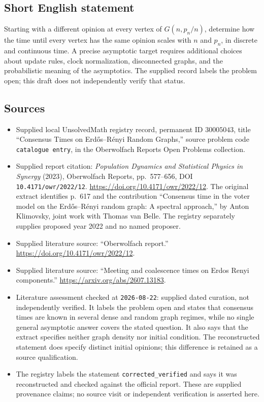 \documentclass[11pt]{article}
\begin{document}
\subsection{Short English statement}
Starting with a different opinion at every vertex of \(G(n,p_n/n)\), determine how the time until every vertex has the same opinion scales with \(n\) and \(p_n\), in discrete and continuous time. A precise asymptotic target requires additional choices about update rules, clock normalization, disconnected graphs, and the probabilistic meaning of the asymptotics. The supplied record labels the problem open; this draft does not independently verify that status.
\subsection{Sources}
\begin{itemize}
\item Supplied local UnsolvedMath registry record, permanent ID \(30005043\), title ``Consensus Times on Erd\H{o}s--R\'enyi Random Graphs,'' source problem code \texttt{catalogue entry}, in the Oberwolfach Reports Open Problems collection.
\item Supplied report citation: \emph{Population Dynamics and Statistical Physics in Synergy} (2023), Oberwolfach Reports, pp.~577--656, DOI \texttt{10.4171/owr/2022/12}. \url{https://doi.org/10.4171/owr/2022/12}. The original extract identifies p.~617 and the contribution ``Consensus time in the voter model on the Erd\H{o}s--R\'enyi random graph: A spectral approach,'' by Anton Klimovsky, joint work with Thomas van Belle. The registry separately supplies proposed year 2022 and no named proposer.
\item Supplied literature source: ``Oberwolfach report.'' \url{https://doi.org/10.4171/owr/2022/12}.
\item Supplied literature source: ``Meeting and coalescence times on Erdos Renyi components.'' \url{https://arxiv.org/abs/2607.13183}.
\item Literature assessment checked at \texttt{2026-08-22}: supplied dated curation, not independently verified. It labels the problem open and states that consensus times are known in several dense and random graph regimes, while no single general asymptotic answer covers the stated question. It also says that the extract specifies neither graph density nor initial condition. The reconstructed statement does specify distinct initial opinions; this difference is retained as a source qualification.
\item The registry labels the statement \texttt{corrected\_verified} and says it was reconstructed and checked against the official report. These are supplied provenance claims; no source visit or independent verification is asserted here.
\end{itemize}
\end{document}
